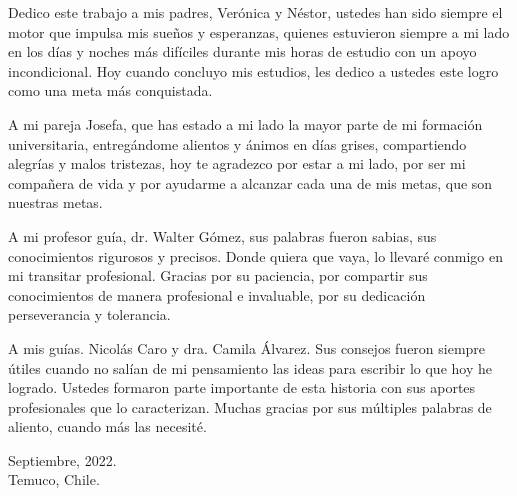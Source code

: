 


Dedico este trabajo a mis padres, Verónica y Néstor, ustedes han sido siempre el motor que impulsa mis sueños y esperanzas, 
quienes estuvieron siempre a mi lado en los días y noches más difíciles durante mis horas de estudio con un apoyo incondicional. 
Hoy cuando concluyo mis estudios, les dedico a ustedes este logro como una meta más conquistada. 

A mi pareja Josefa, que has estado a mi lado la mayor parte de mi formación universitaria, entregándome alientos y ánimos en días grises, compartiendo alegrías y malos tristezas,
hoy te agradezco por estar a mi lado, por ser mi compañera de vida y por ayudarme a alcanzar cada una de mis metas, que son nuestras metas.

A mi profesor guía, dr. Walter Gómez, sus palabras fueron sabias, sus conocimientos rigurosos y precisos. Donde quiera que vaya, 
lo llevaré conmigo en mi transitar profesional. Gracias por su paciencia, por compartir sus conocimientos de manera profesional e invaluable, por su dedicación perseverancia y tolerancia.

A mis guías. Nicolás Caro y dra. Camila Álvarez. Sus consejos fueron siempre 
útiles cuando no salían de mi pensamiento las ideas para escribir lo que hoy he logrado. Ustedes formaron parte importante de esta historia con sus aportes profesionales que 
lo caracterizan. Muchas gracias por sus múltiples palabras de aliento, cuando más las necesité. 

\vfill
\singlespacing
\begin{flushright}
	\noindent
    Septiembre, 2022. \\
	Temuco, Chile. 
\end{flushright}
    
